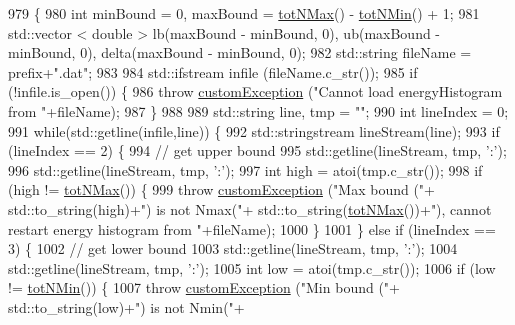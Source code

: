 \begin{DoxyCode}
979                                                               \{
980     \textcolor{keywordtype}{int} minBound = 0, maxBound = \hyperlink{classsim_system_aee2c65ecb43a35c0c4d070cdb45f7dc0}{totNMax}() - \hyperlink{classsim_system_af10842e0eaa638373b8717c87b47e6bc}{totNMin}() + 1;
981     std::vector < double > lb(maxBound - minBound, 0), ub(maxBound - minBound, 0), delta(maxBound - 
      minBound, 0);
982     std::string fileName = prefix+\textcolor{stringliteral}{".dat"};
983 
984     std::ifstream infile (fileName.c\_str());
985     \textcolor{keywordflow}{if} (!infile.is\_open()) \{
986         \textcolor{keywordflow}{throw} \hyperlink{classcustom_exception}{customException} (\textcolor{stringliteral}{"Cannot load energyHistogram from "}+fileName);
987     \}
988 
989     std::string line, tmp = \textcolor{stringliteral}{""};
990     \textcolor{keywordtype}{int} lineIndex = 0;
991     \textcolor{keywordflow}{while}(std::getline(infile,line)) \{
992         std::stringstream lineStream(line);
993         \textcolor{keywordflow}{if} (lineIndex == 2) \{
994             \textcolor{comment}{// get upper bound}
995             std::getline(lineStream, tmp, \textcolor{charliteral}{':'});
996             std::getline(lineStream, tmp, \textcolor{charliteral}{':'});
997             \textcolor{keywordtype}{int} high = atoi(tmp.c\_str());
998             \textcolor{keywordflow}{if} (high != \hyperlink{classsim_system_aee2c65ecb43a35c0c4d070cdb45f7dc0}{totNMax}()) \{
999                 \textcolor{keywordflow}{throw} \hyperlink{classcustom_exception}{customException} (\textcolor{stringliteral}{"Max bound ("}+ std::to\_string(high)+\textcolor{stringliteral}{") is not Nmax("}+
      std::to\_string(\hyperlink{classsim_system_aee2c65ecb43a35c0c4d070cdb45f7dc0}{totNMax}())+\textcolor{stringliteral}{"), cannot restart energy histogram from "}+fileName);
1000             \}
1001         \} \textcolor{keywordflow}{else} \textcolor{keywordflow}{if} (lineIndex == 3) \{
1002             \textcolor{comment}{// get lower bound}
1003             std::getline(lineStream, tmp, \textcolor{charliteral}{':'});
1004             std::getline(lineStream, tmp, \textcolor{charliteral}{':'});
1005             \textcolor{keywordtype}{int} low = atoi(tmp.c\_str());
1006             \textcolor{keywordflow}{if} (low != \hyperlink{classsim_system_af10842e0eaa638373b8717c87b47e6bc}{totNMin}()) \{
1007                 \textcolor{keywordflow}{throw} \hyperlink{classcustom_exception}{customException} (\textcolor{stringliteral}{"Min bound ("}+ std::to\_string(low)+\textcolor{stringliteral}{") is not Nmin("}+

\end{DoxyCode}
